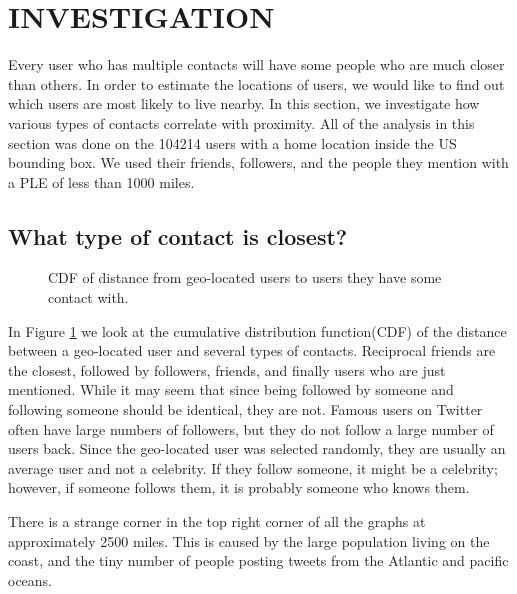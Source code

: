 \documentclass{sig-alternate}
\begin{document}
\begin{figure*}
\centering
{}
\caption{
Hi!
}
\label{fig:LocalAll}
\end{figure*}

\section{INVESTIGATION}
Every user who has multiple contacts will have some people who are much
closer than others. In order to estimate the locations of users, we would like
to find out which users are most likely to live nearby.  In this section, we
investigate how various types of contacts correlate with proximity.
All of the analysis in this section was done on the 104214 users with a home location inside the US bounding box. We used their friends, followers, and the people they mention with a PLE of less than 1000 miles.

\subsection{What type of contact is closest?}
\begin{figure}
\centering
{}
\caption{
CDF of distance from geo-located users to users they have some contact
with.
}
\label{fig:EdgeTypesCum}
\end{figure}
In Figure \ref{fig:EdgeTypesCum} we look at the cumulative distribution function(CDF) of the distance between a geo-located user and several types of contacts.
Reciprocal friends are the closest, followed by followers, friends, and finally users who are just mentioned.
While it may seem that since being followed by someone and following someone should be identical, they are not.
Famous users on Twitter often have large numbers of followers, but they do not follow a large number of users back.
Since the geo-located user was selected randomly, they are usually an average user and not a celebrity.
If they follow someone, it might be a celebrity; however, if someone follows them, it is probably someone who knows them.

There is a strange corner in the top right corner of all the graphs at approximately 2500 miles. This is caused by the large population living on the coast, and the tiny number of people posting tweets from the Atlantic and pacific oceans.
\end{document}
